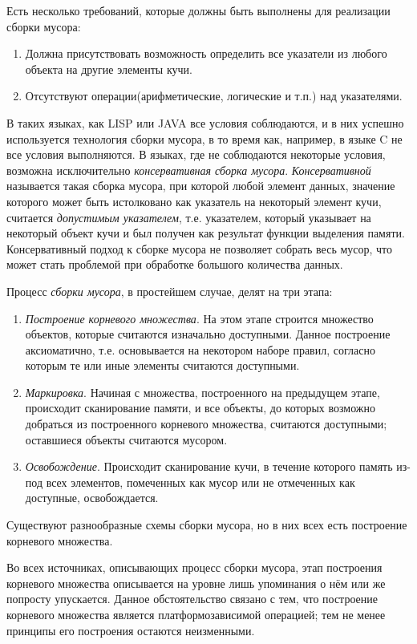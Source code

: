 Есть несколько требований, которые должны быть выполнены для реализации сборки мусора:

\begin{enumerate}
\item Должна присутствовать возможность определить все указатели из любого объекта на другие элементы кучи.
\item Отсутствуют операции(арифметические, логические и т.п.) над указателями.
\end{enumerate}

В таких языках, как LISP или JAVA все условия соблюдаются, и в них успешно используется технология сборки мусора,
в то время как, например, в языке C не все условия выполняются. В языках, где не соблюдаются некоторые условия, возможна исключительно
\emph{консервативная сборка мусора}. \emph{Консервативной} называется такая сборка мусора, при которой любой элемент данных, значение 
которого может быть истолковано как указатель на некоторый элемент кучи, считается  \emph{допустимым указателем}, т.е. указателем, который 
указывает на некоторый объект кучи и был получен как результат функции выделения памяти. Консервативный подход к сборке мусора не позволяет 
собрать весь мусор, что может стать проблемой при обработке большого количества данных.

Процесс \emph{сборки мусора}, в простейшем случае, делят на три этапа:
\begin{enumerate}
\item \emph{Построение корневого множества}. На этом этапе строится множество объектов, которые считаются изначально доступными. 
Данное построение аксиоматично, т.е. основывается на некотором наборе правил, согласно которым те или иные элементы считаются доступными.
\item \emph{Маркировка}. Начиная с множества, построенного на предыдущем этапе, происходит сканирование памяти, и все объекты, до которых 
возможно добраться из построенного корневого множества, считаются доступными; оставшиеся объекты считаются мусором.
\item \emph{Освобождение}. Происходит сканирование кучи, в течение которого память из-под всех элементов, помеченных как мусор или не отмеченных 
как доступные, освобождается.
\end{enumerate}

Существуют разнообразные схемы сборки мусора, но в них всех есть построение корневого множества.

Во всех источниках, описывающих процесс сборки мусора, этап построения корневого множества описывается на уровне лишь упоминания о нём или же 
попросту упускается. Данное обстоятельство связано с тем, что построение корневого множества является платформозависимой операцией; 
тем не менее принципы его построения остаются неизменными.

